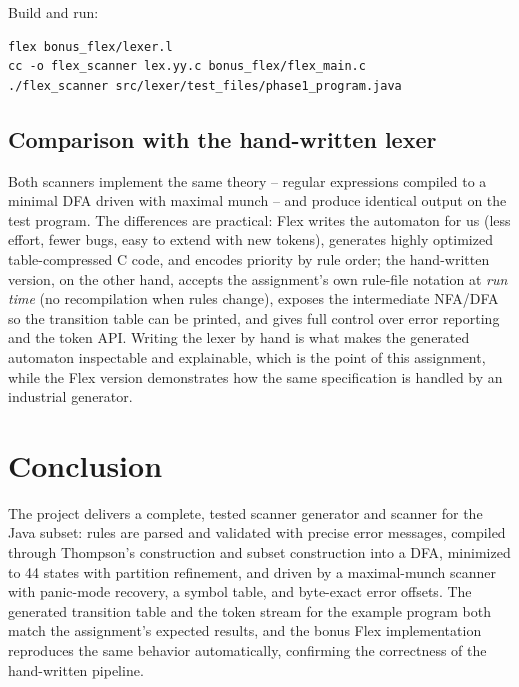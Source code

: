 \documentclass[11pt,a4paper]{article}
\begin{document}
Build and run:
\begin{lstlisting}[basicstyle=\ttfamily\small]
flex bonus_flex/lexer.l
cc -o flex_scanner lex.yy.c bonus_flex/flex_main.c
./flex_scanner src/lexer/test_files/phase1_program.java
\end{lstlisting}

\subsection{Comparison with the hand-written lexer}
Both scanners implement the same theory -- regular expressions compiled to a
minimal DFA driven with maximal munch -- and produce identical output on the
test program. The differences are practical: Flex writes the automaton for us
(less effort, fewer bugs, easy to extend with new tokens), generates highly
optimized table-compressed C code, and encodes priority by rule order; the
hand-written version, on the other hand, accepts the assignment's own rule-file
notation at \emph{run time} (no recompilation when rules change), exposes the
intermediate NFA/DFA so the transition table can be printed, and gives full
control over error reporting and the token API. Writing the lexer by hand is
what makes the generated automaton inspectable and explainable, which is the
point of this assignment, while the Flex version demonstrates how the same
specification is handled by an industrial generator.

\section{Conclusion}
The project delivers a complete, tested scanner generator and scanner for the
Java subset: rules are parsed and validated with precise error messages,
compiled through Thompson's construction and subset construction into a DFA,
minimized to 44 states with partition refinement, and driven by a
maximal-munch scanner with panic-mode recovery, a symbol table, and byte-exact
error offsets. The generated transition table and the token stream for the
example program both match the assignment's expected results, and the bonus
Flex implementation reproduces the same behavior automatically, confirming the
correctness of the hand-written pipeline.
\end{document}
